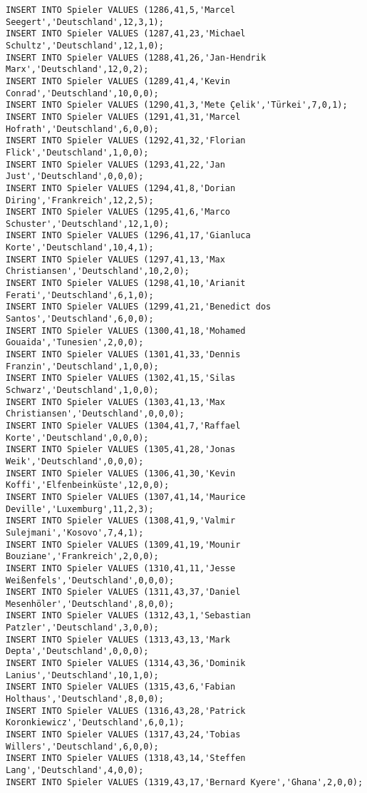 \documentclass{lehramt-informatik-aufgabe}
\begin{document}
\begin{verbatim}
INSERT INTO Spieler VALUES (1286,41,5,'Marcel Seegert','Deutschland',12,3,1);
INSERT INTO Spieler VALUES (1287,41,23,'Michael Schultz','Deutschland',12,1,0);
INSERT INTO Spieler VALUES (1288,41,26,'Jan-Hendrik Marx','Deutschland',12,0,2);
INSERT INTO Spieler VALUES (1289,41,4,'Kevin Conrad','Deutschland',10,0,0);
INSERT INTO Spieler VALUES (1290,41,3,'Mete Çelik','Türkei',7,0,1);
INSERT INTO Spieler VALUES (1291,41,31,'Marcel Hofrath','Deutschland',6,0,0);
INSERT INTO Spieler VALUES (1292,41,32,'Florian Flick','Deutschland',1,0,0);
INSERT INTO Spieler VALUES (1293,41,22,'Jan Just','Deutschland',0,0,0);
INSERT INTO Spieler VALUES (1294,41,8,'Dorian Diring','Frankreich',12,2,5);
INSERT INTO Spieler VALUES (1295,41,6,'Marco Schuster','Deutschland',12,1,0);
INSERT INTO Spieler VALUES (1296,41,17,'Gianluca Korte','Deutschland',10,4,1);
INSERT INTO Spieler VALUES (1297,41,13,'Max Christiansen','Deutschland',10,2,0);
INSERT INTO Spieler VALUES (1298,41,10,'Arianit Ferati','Deutschland',6,1,0);
INSERT INTO Spieler VALUES (1299,41,21,'Benedict dos Santos','Deutschland',6,0,0);
INSERT INTO Spieler VALUES (1300,41,18,'Mohamed Gouaida','Tunesien',2,0,0);
INSERT INTO Spieler VALUES (1301,41,33,'Dennis Franzin','Deutschland',1,0,0);
INSERT INTO Spieler VALUES (1302,41,15,'Silas Schwarz','Deutschland',1,0,0);
INSERT INTO Spieler VALUES (1303,41,13,'Max Christiansen','Deutschland',0,0,0);
INSERT INTO Spieler VALUES (1304,41,7,'Raffael Korte','Deutschland',0,0,0);
INSERT INTO Spieler VALUES (1305,41,28,'Jonas Weik','Deutschland',0,0,0);
INSERT INTO Spieler VALUES (1306,41,30,'Kevin Koffi','Elfenbeinküste',12,0,0);
INSERT INTO Spieler VALUES (1307,41,14,'Maurice Deville','Luxemburg',11,2,3);
INSERT INTO Spieler VALUES (1308,41,9,'Valmir Sulejmani','Kosovo',7,4,1);
INSERT INTO Spieler VALUES (1309,41,19,'Mounir Bouziane','Frankreich',2,0,0);
INSERT INTO Spieler VALUES (1310,41,11,'Jesse Weißenfels','Deutschland',0,0,0);
INSERT INTO Spieler VALUES (1311,43,37,'Daniel Mesenhöler','Deutschland',8,0,0);
INSERT INTO Spieler VALUES (1312,43,1,'Sebastian Patzler','Deutschland',3,0,0);
INSERT INTO Spieler VALUES (1313,43,13,'Mark Depta','Deutschland',0,0,0);
INSERT INTO Spieler VALUES (1314,43,36,'Dominik Lanius','Deutschland',10,1,0);
INSERT INTO Spieler VALUES (1315,43,6,'Fabian Holthaus','Deutschland',8,0,0);
INSERT INTO Spieler VALUES (1316,43,28,'Patrick Koronkiewicz','Deutschland',6,0,1);
INSERT INTO Spieler VALUES (1317,43,24,'Tobias Willers','Deutschland',6,0,0);
INSERT INTO Spieler VALUES (1318,43,14,'Steffen Lang','Deutschland',4,0,0);
INSERT INTO Spieler VALUES (1319,43,17,'Bernard Kyere','Ghana',2,0,0);

\end{verbatim}
\end{document}
